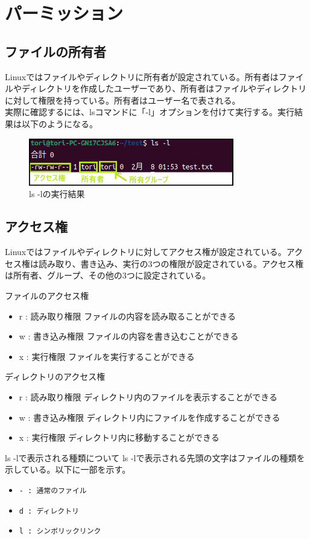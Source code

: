 \documentclass[a4paper, 11pt, dvipdfmx]{jsarticle}
\begin{document}
\section{パーミッション}
\subsection{ファイルの所有者}
Linuxではファイルやディレクトリに所有者が設定されている。所有者はファイルやディレクトリを作成したユーザーであり、所有者はファイルやディレクトリに対して権限を持っている。所有者はユーザー名で表される。\\
実際に確認するには、lsコマンドに「-l」オプションを付けて実行する。実行結果は以下のようになる。
\begin{figure}[H]
  \centering
  \includegraphics[width=0.8\textwidth]{images/linux-server/5_1-ls-l.png}
  \caption{ls -lの実行結果}
  \label{fig:ls-l}
\end{figure}
\subsection{アクセス権}
Linuxではファイルやディレクトリに対してアクセス権が設定されている。アクセス権は読み取り、書き込み、実行の3つの権限が設定されている。アクセス権は所有者、グループ、その他の3つに設定されている。\\
\begin{hosokubox}{ファイルのアクセス権}
  \begin{itemize}
    \item r : 読み取り権限  ファイルの内容を読み取ることができる
    \item w : 書き込み権限  ファイルの内容を書き込むことができる
    \item x : 実行権限  ファイルを実行することができる
  \end{itemize}
\end{hosokubox}
\begin{hosokubox}{ディレクトリのアクセス権}
  \begin{itemize}
    \item r : 読み取り権限  ディレクトリ内のファイルを表示することができる
    \item w : 書き込み権限  ディレクトリ内にファイルを作成することができる
    \item x : 実行権限  ディレクトリ内に移動することができる
  \end{itemize}
\end{hosokubox}
\begin{johobox}{ls -lで表示される種類について}
  ls -lで表示される先頭の文字はファイルの種類を示している。以下に一部を示す。
  \begin{itemize}
    \item \verb|- : 通常のファイル|
    \item \verb|d : ディレクトリ|
    \item \verb|l : シンボリックリンク|
  \end{itemize}
\end{johobox}
\end{document}
